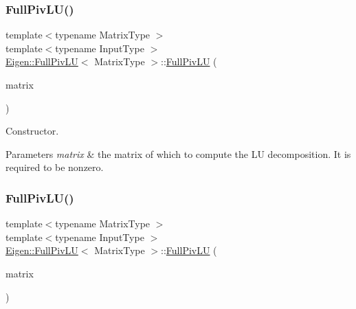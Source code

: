 \subsubsection{\texorpdfstring{FullPivLU()}{FullPivLU()}\hspace{0.1cm}{\footnotesize\ttfamily [3/4]}}
{\footnotesize\ttfamily template$<$typename Matrix\+Type $>$ \\
template$<$typename Input\+Type $>$ \\
\mbox{\hyperlink{class_eigen_1_1_full_piv_l_u}{Eigen\+::\+Full\+Piv\+LU}}$<$ Matrix\+Type $>$\+::\mbox{\hyperlink{class_eigen_1_1_full_piv_l_u}{Full\+Piv\+LU}} (\begin{DoxyParamCaption}\item[{const \mbox{\hyperlink{struct_eigen_1_1_eigen_base}{Eigen\+Base}}$<$ Input\+Type $>$ \&}]{matrix }\end{DoxyParamCaption})\hspace{0.3cm}{\ttfamily [explicit]}}

Constructor.


\begin{DoxyParams}{Parameters}
{\em matrix} & the matrix of which to compute the LU decomposition. It is required to be nonzero. \\
\hline
\end{DoxyParams}
\mbox{\label{class_eigen_1_1_full_piv_l_u_a3e903b9f401e3fc5d1ca7c6951c76185}} 
\subsubsection{\texorpdfstring{FullPivLU()}{FullPivLU()}\hspace{0.1cm}{\footnotesize\ttfamily [4/4]}}
{\footnotesize\ttfamily template$<$typename Matrix\+Type $>$ \\
template$<$typename Input\+Type $>$ \\
\mbox{\hyperlink{class_eigen_1_1_full_piv_l_u}{Eigen\+::\+Full\+Piv\+LU}}$<$ Matrix\+Type $>$\+::\mbox{\hyperlink{class_eigen_1_1_full_piv_l_u}{Full\+Piv\+LU}} (\begin{DoxyParamCaption}\item[{\mbox{\hyperlink{struct_eigen_1_1_eigen_base}{Eigen\+Base}}$<$ Input\+Type $>$ \&}]{matrix }\end{DoxyParamCaption})\hspace{0.3cm}{\ttfamily [explicit]}}



